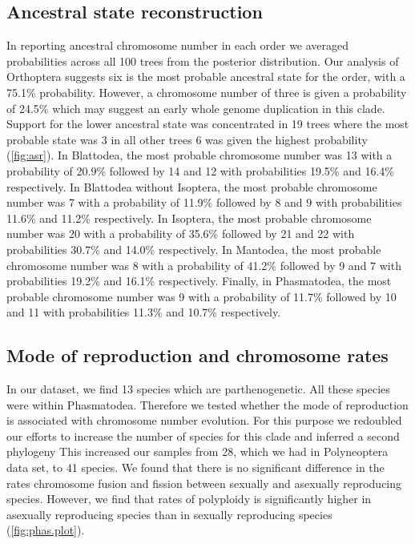 \subsection{Ancestral state reconstruction}
In reporting ancestral chromosome number in each order we averaged probabilities across all 100 trees from the posterior distribution. 
Our analysis of Orthoptera suggests six is the most probable ancestral state for the order, with a 75.1\% probability.
However, a chromosome number of three is given a probability of 24.5\% which may suggest an early whole genome duplication in this clade.
Support for the lower ancestral state was concentrated in 19 trees where the most probable state was 3 in all other trees 6 was given the highest probability (\cref{fig:asr}). 
In Blattodea, the most probable chromosome number was 13 with a probability of 20.9\% followed by 14 and 12 with probabilities 19.5\% and 16.4\% respectively. 
In Blattodea without Isoptera, the most probable chromosome number was 7 with a probability of 11.9\% followed by 8 and 9 with probabilities 11.6\% and 11.2\% respectively.
In Isoptera, the most probable chromosome number was 20 with a probability of 35.6\% followed by 21 and 22 with probabilities 30.7\% and 14.0\% respectively.
In Mantodea, the most probable chromosome number was 8 with a probability of 41.2\% followed by 9 and 7 with probabilities 19.2\% and 16.1\% respectively.
Finally, in Phasmatodea, the most probable chromosome number was 9 with a probability of 11.7\% followed by 10 and 11 with probabilities 11.3\% and 10.7\% respectively.

\subsection{Mode of reproduction and chromosome rates}
In our dataset, we find 13 species which are parthenogenetic. 
All these species were within Phasmatodea.
Therefore we tested whether the mode of reproduction is associated with chromosome number evolution. 
For this purpose we redoubled our efforts to increase the number of species for this clade and inferred a second phylogeny %
This increased our samples from 28, which we had in Polyneoptera data set, to 41 species. 
We found that there is no significant difference in the rates chromosome fusion and fission between sexually and asexually reproducing species.
However, we find that rates of polyploidy is significantly higher in asexually reproducing species than in sexually reproducing species (\cref{fig:phas.plot}).